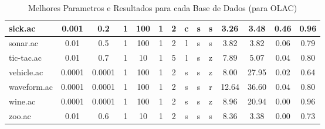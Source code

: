 \begin{table}[htbp]
\begin{tabular}{|l|c|c|c|c|c|c|c|c|c||c|c|c|c|}
		\hline
		sick.ac        & 0.001    & 0.2         & 1              & 100                 & 1             & 2             & c      & s        & s        & 3.26           & 3.48           & 0.46           & 0.96           \\
		\hline
		sonar.ac       & 0.01     & 0.5         & 1              & 100                 & 1             & 2             & l      & s        & s        & 3.82           & 3.82           & 0.06           & 0.79           \\
		\hline
		tic-tac.ac     & 0.01     & 0.7         & 1              & 10                  & 1             & 5             & l      & s        & z        & 7.89           & 5.07           & 0.04           & 0.80           \\
		\hline
		vehicle.ac     & 0.0001   & 0.0001      & 1              & 100                 & 1             & 2             & s      & s        & z        & 8.00           & 27.95          & 0.02           & 0.64           \\
		\hline
		waveform.ac    & 0.0001   & 0.0001      & 1              & 100                 & 1             & 2             & s      & s        & r        & 12.64          & 36.60          & 0.04           & 0.80           \\
		\hline
		wine.ac        & 0.0001   & 0.0001      & 1              & 100                 & 1             & 2             & s      & s        & z        & 8.96           & 20.94          & 0.00           & 0.96           \\
		\hline
		zoo.ac         & 0.01     & 0.6         & 1              & 10                  & 1             & 2             & s      & s        & s        & 8.36           & 3.38           & 0.00           & 0.73           \\
		\hline
		\end{tabular}
	\caption{Melhores Parametros e Resultados para cada Base de Dados (para OLAC)}
	\label{tab:best_runs_for_each_db_olac_uc}
\end{table}